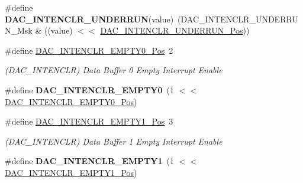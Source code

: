 \begin{DoxyCompactItemize}
\item 
\hypertarget{group___s_a_m_l21___d_a_c_ga6a6af8e619efc694b4d94376525db88d}{}\#define {\bfseries D\+A\+C\+\_\+\+I\+N\+T\+E\+N\+C\+L\+R\+\_\+\+U\+N\+D\+E\+R\+R\+U\+N}(value)~(D\+A\+C\+\_\+\+I\+N\+T\+E\+N\+C\+L\+R\+\_\+\+U\+N\+D\+E\+R\+R\+U\+N\+\_\+\+Msk \& ((value) $<$$<$ \hyperlink{group___s_a_m_l21___d_a_c_ga1a17f5ec1b6b1d51eb7caa0e41fd01f8}{D\+A\+C\+\_\+\+I\+N\+T\+E\+N\+C\+L\+R\+\_\+\+U\+N\+D\+E\+R\+R\+U\+N\+\_\+\+Pos}))\label{group___s_a_m_l21___d_a_c_ga6a6af8e619efc694b4d94376525db88d}

\item 
\hypertarget{group___s_a_m_l21___d_a_c_ga1de573071bd6e76fc8364ced19f28830}{}\#define \hyperlink{group___s_a_m_l21___d_a_c_ga1de573071bd6e76fc8364ced19f28830}{D\+A\+C\+\_\+\+I\+N\+T\+E\+N\+C\+L\+R\+\_\+\+E\+M\+P\+T\+Y0\+\_\+\+Pos}~2\label{group___s_a_m_l21___d_a_c_ga1de573071bd6e76fc8364ced19f28830}

\begin{DoxyCompactList}\small\item\em (D\+A\+C\+\_\+\+I\+N\+T\+E\+N\+C\+L\+R) Data Buffer 0 Empty Interrupt Enable \end{DoxyCompactList}\item 
\hypertarget{group___s_a_m_l21___d_a_c_ga973835f2893ebe5567daf20837032a28}{}\#define {\bfseries D\+A\+C\+\_\+\+I\+N\+T\+E\+N\+C\+L\+R\+\_\+\+E\+M\+P\+T\+Y0}~(1 $<$$<$ \hyperlink{group___s_a_m_l21___d_a_c_ga1de573071bd6e76fc8364ced19f28830}{D\+A\+C\+\_\+\+I\+N\+T\+E\+N\+C\+L\+R\+\_\+\+E\+M\+P\+T\+Y0\+\_\+\+Pos})\label{group___s_a_m_l21___d_a_c_ga973835f2893ebe5567daf20837032a28}

\item 
\hypertarget{group___s_a_m_l21___d_a_c_gacc84fea126c3689c58e3e4675fd3f7eb}{}\#define \hyperlink{group___s_a_m_l21___d_a_c_gacc84fea126c3689c58e3e4675fd3f7eb}{D\+A\+C\+\_\+\+I\+N\+T\+E\+N\+C\+L\+R\+\_\+\+E\+M\+P\+T\+Y1\+\_\+\+Pos}~3\label{group___s_a_m_l21___d_a_c_gacc84fea126c3689c58e3e4675fd3f7eb}

\begin{DoxyCompactList}\small\item\em (D\+A\+C\+\_\+\+I\+N\+T\+E\+N\+C\+L\+R) Data Buffer 1 Empty Interrupt Enable \end{DoxyCompactList}\item 
\hypertarget{group___s_a_m_l21___d_a_c_gac9aea0a876137d7fae8f911af65a2b04}{}\#define {\bfseries D\+A\+C\+\_\+\+I\+N\+T\+E\+N\+C\+L\+R\+\_\+\+E\+M\+P\+T\+Y1}~(1 $<$$<$ \hyperlink{group___s_a_m_l21___d_a_c_gacc84fea126c3689c58e3e4675fd3f7eb}{D\+A\+C\+\_\+\+I\+N\+T\+E\+N\+C\+L\+R\+\_\+\+E\+M\+P\+T\+Y1\+\_\+\+Pos})\label{group___s_a_m_l21___d_a_c_gac9aea0a876137d7fae8f911af65a2b04}


\end{DoxyCompactItemize}
